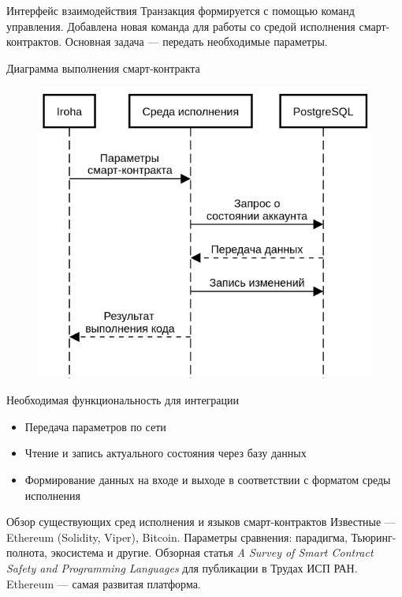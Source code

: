 \documentclass[hyperref={pdfpagelabels=false}]{beamer}
\begin{document}
\begin{frame}{Интерфейс взаимодействия}
Транзакция формируется с помощью команд управления.
\vfill
Добавлена новая команда для работы со средой исполнения смарт-контрактов. 
Основная задача --- передать необходимые параметры. 

\end{frame} 

\begin{frame}{Диаграмма выполнения смарт-контракта}
\begin{figure}
\includegraphics[scale=0.44]{inter.png}
\end{figure}
\end{frame} 

\begin{frame}{Необходимая функциональность для интеграции}
\begin{itemize}
\item Передача параметров по сети
\vfill
\item Чтение и запись актуального состояния через базу данных
\vfill
\item Формирование данных на входе и выходе в соответствии с форматом среды исполнения
\end{itemize}
\end{frame} 

\begin{frame}{Обзор существующих сред исполнения и языков смарт-контрактов}
Известные — Ethereum (Solidity, Viper), Bitcoin. Параметры сравнения: парадигма, Тьюринг-полнота, экосистема и другие.
\vfill
Обзорная статья \emph{A Survey of Smart Contract Safety and Programming Languages} для публикации в Трудах ИСП РАН.
\vfill
Ethereum --- самая развитая платформа.
\end{frame} 
\end{document}
